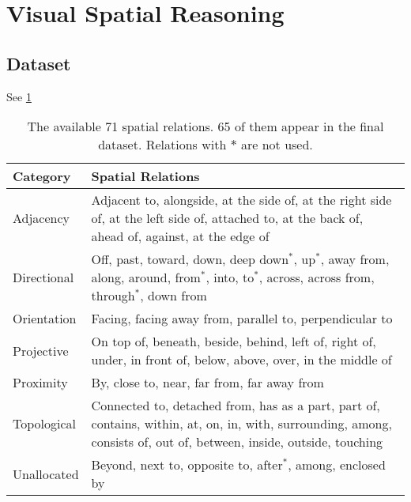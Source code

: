 \section{Visual Spatial Reasoning} \label{sec:vsr}

\subsection{Dataset}

See \cref{tab:spatial_relations}

\begin{table}[ht]
    \centering
    \begin{adjustbox}{max width=\textwidth}
    \begin{tabular}{l|l}
    \toprule
        \rowcolor{DarkGray}
    Category & Spatial Relations \\
    \midrule
    Adjacency   & \makecell[l]{Adjacent to, alongside, at the side of, at the right side of, at the left side of, attached to, at the back of,\\ ahead of, against, at the edge of} \\
    \rowcolor{Gray}
 Directional & \makecell[l]{Off, past, toward, down, deep down$^\ast$, up$^\ast$, away from, along, around, from$^\ast$, into, to$^\ast$, across, across from, \\through$^\ast$, down from }\\
    Orientation & Facing, facing away from, parallel to, perpendicular to\\
    \rowcolor{Gray}
    Projective & On top of, beneath, beside, behind, left of, right of, under, in front of, below, above, over, in the middle of\\
    Proximity & By, close to, near, far from, far away from \\
        \rowcolor{Gray}
    Topological & \makecell[l]{Connected to, detached from, has as a part, part of, contains, within, at, on, in, with, surrounding, among, \\ consists of, out of, between, inside, outside, touching}\\
    Unallocated & Beyond, next to, opposite to, after$^\ast$, among, enclosed by \\
\bottomrule
    \end{tabular}
    \end{adjustbox}
    \caption{The available 71 spatial relations. 65 of them appear in the final dataset. Relations with $\ast$ are not used.}
    \label{tab:spatial_relations}
\end{table}
